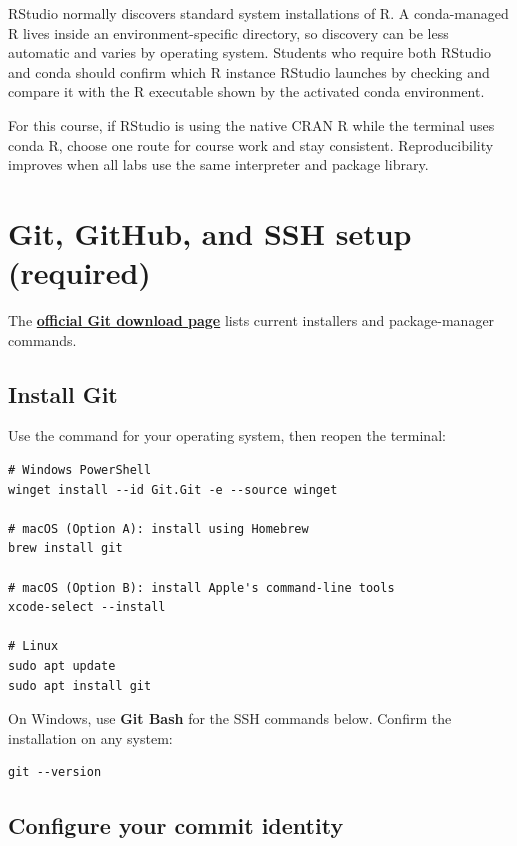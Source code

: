 RStudio normally discovers standard system installations of R. A conda-managed R lives inside an environment-specific directory, so discovery can be less automatic and varies by operating system. Students who require both RStudio and conda should confirm which R instance RStudio launches by checking  and compare it with the R executable shown by the activated conda environment.

For this course, if RStudio is using the native CRAN R while the terminal uses conda R, choose one route for course work and stay consistent. Reproducibility improves when all labs use the same interpreter and package library.


\section{Git, GitHub, and SSH setup (required)}
\label{sec:git-ssh}

The \href{https://git-scm.com/install/}{\textbf{official Git download page}} lists current installers and package-manager commands.

\subsection{Install Git}

Use the command for your operating system, then reopen the terminal:

\begin{lstlisting}[style=mlterminal]
# Windows PowerShell
winget install --id Git.Git -e --source winget

# macOS (Option A): install using Homebrew
brew install git

# macOS (Option B): install Apple's command-line tools
xcode-select --install

# Linux
sudo apt update
sudo apt install git
\end{lstlisting}

On Windows, use \textbf{Git Bash} for the SSH commands below. Confirm the installation on any system:

\begin{lstlisting}[style=mlterminal]
git --version
\end{lstlisting}

\subsection{Configure your commit identity}

